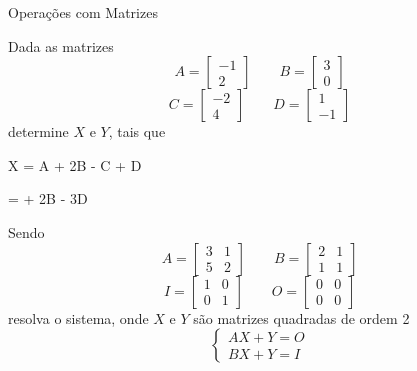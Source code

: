 \begin{exercicios}{Operações com Matrizes}
    \begin{exercicio}
        Dada as matrizes
        \[A = \left[\begin{array}{r}
            -1 \\
             2
        \end{array} \right]
        \qquad
        B = \left[\begin{array}{c}
            3 \\
            0
        \end{array} \right]\] 
        \[C = \left[\begin{array}{r}
            -2 \\
             4
        \end{array} \right] 
        \qquad
        D = \left[\begin{array}{r}
             1 \\
            -1
        \end{array} \right]\]
        determine $X$ e $Y$, tais que
        \begin{mathlist}[1]
            \item X = A + 2B - C + D
            \item {} =  + 2B - 3D
        \end{mathlist}
    \end{exercicio}

    \begin{exercicio}
        Sendo
        \[A = \left[\begin{array}{cc}
            3 & 1 \\
            5 & 2
        \end{array} \right]
        \qquad
        B = \left[\begin{array}{cc}
            2 & 1 \\
            1 & 1
        \end{array} \right]\]
        \[I = \left[\begin{array}{cc}
            1 & 0 \\
            0 & 1
        \end{array} \right]    
        \qquad
        O = \left[\begin{array}{cc}
            0 & 0 \\
            0 & 0
        \end{array} \right]\]
        resolva o sistema, onde $X$ e $Y$ são matrizes quadradas de ordem 2
        \[\begin{cases}
            AX + Y = O \\
            BX + Y = I
        \end{cases}\]
    \end{exercicio}
    

\end{exercicios}
